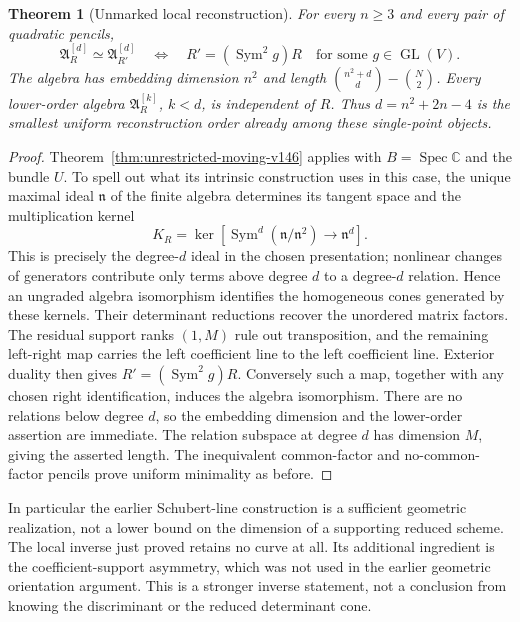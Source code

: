 \documentclass[11pt,reqno]{amsart}
\numberwithin{equation}{section}
\newtheorem{theorem}{Theorem}[section]
\theoremstyle{definition}\newtheorem{definition}[theorem]{Definition}
\theoremstyle{remark}\newtheorem{remark}[theorem]{Remark}
\newcommand{\C}{\mathbb C}\newcommand{\Q}{\mathbb Q}
\DeclareMathOperator{\Sym}{Sym}\DeclareMathOperator{\Gr}{Gr}
\DeclareMathOperator{\Spec}{Spec}\DeclareMathOperator{\PGL}{PGL}
\begin{document}
\begin{theorem}[Unmarked local reconstruction]
\label{thm:artin-local-inverse-v146}
For every \(n\ge3\) and every pair of quadratic pencils,
\begin{equation}\label{eq:artin-local-inverse-v146}
 \mathfrak A_R^{[d]}\simeq\mathfrak A_{R'}^{[d]}
 \quad\Longleftrightarrow\quad
 R'=(\Sym^2g)R\quad\text{for some }g\in\operatorname{GL}(V).
\end{equation}
The algebra has embedding dimension \(n^2\) and length
\(\binom{n^2+d}{d}-\binom N2\).  Every lower-order algebra
\(\mathfrak A_R^{[k]}\), \(k<d\), is independent of \(R\).
Thus \(d=n^2+2n-4\) is the smallest uniform reconstruction order
already among these single-point objects.
\end{theorem}
\begin{proof}
Theorem~\ref{thm:unrestricted-moving-v146} applies with
\(B=\Spec\C\) and the bundle \(U\).  To spell out what its
intrinsic construction uses in this case, the unique maximal ideal
\(\mathfrak n\) of the finite algebra determines its tangent
space and the multiplication kernel
\[
 K_R=\ker\left[\Sym^d(\mathfrak n/\mathfrak n^2)
                                      \longrightarrow\mathfrak n^d\right].
\]
This is precisely the degree-\(d\) ideal in the chosen presentation;
nonlinear changes of generators contribute only terms above degree
\(d\) to a degree-\(d\) relation.  Hence an ungraded algebra
isomorphism identifies the homogeneous cones generated by these
kernels.  Their determinant reductions recover the unordered
matrix factors.  The residual support ranks \((1,M)\) rule out
transposition, and the remaining left-right map carries the left
coefficient line to the left coefficient line.  Exterior duality
then gives \(R'=(\Sym^2g)R\).  Conversely such a map, together
with any chosen right identification, induces the algebra
isomorphism.  There are no relations below degree \(d\), so the
embedding dimension and the lower-order assertion are immediate.
The relation subspace at degree \(d\) has dimension \(M\), giving
the asserted length.  The inequivalent common-factor and
no-common-factor pencils prove uniform minimality as before.
\end{proof}

In particular the earlier Schubert-line construction is a sufficient
geometric realization, not a lower bound on the dimension of a
supporting reduced scheme.  The local inverse just proved retains no
curve at all.  Its additional ingredient is the coefficient-support
asymmetry, which was not used in the earlier geometric orientation
argument.  This is a stronger inverse statement, not a conclusion
from knowing the discriminant or the reduced determinant cone.
\end{document}
